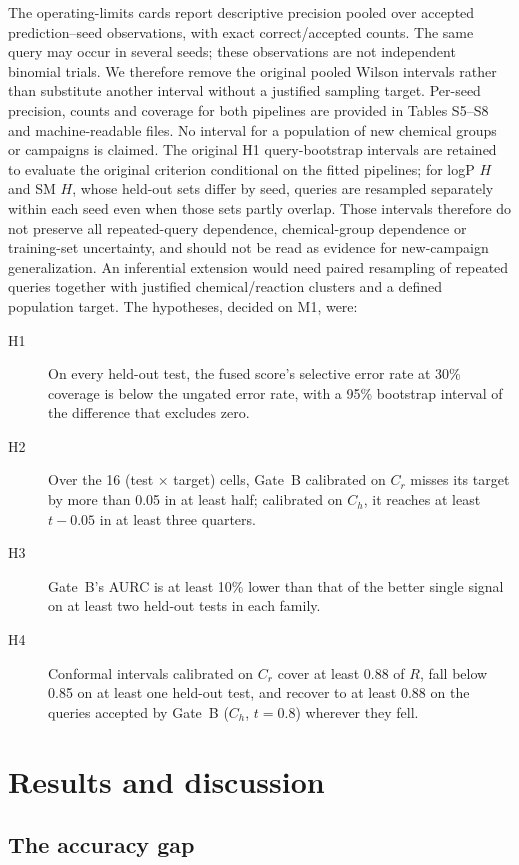 \documentclass[11pt,letterpaper]{article}
\begin{document}
The operating-limits cards report descriptive precision pooled over accepted prediction--seed observations, with exact correct/accepted counts. The same query may occur in several seeds; these observations are not independent binomial trials. We therefore remove the original pooled Wilson intervals rather than substitute another interval without a justified sampling target. Per-seed precision, counts and coverage for both pipelines are provided in Tables S5--S8 and machine-readable files. No interval for a population of new chemical groups or campaigns is claimed. The original H1 query-bootstrap intervals are retained to evaluate the original criterion conditional on the fitted pipelines; for logP $H$ and SM $H$, whose held-out sets differ by seed, queries are resampled separately within each seed even when those sets partly overlap. Those intervals therefore do not preserve all repeated-query dependence, chemical-group dependence or training-set uncertainty, and should not be read as evidence for new-campaign generalization. An inferential extension would need paired resampling of repeated queries together with justified chemical/reaction clusters and a defined population target. The hypotheses, decided on M1, were:
\begin{description}
\item[H1] On every held-out test, the fused score's selective error rate at 30\% coverage is below the ungated error rate, with a 95\% bootstrap interval of the difference that excludes zero.
\item[H2] Over the 16 (test $\times$ target) cells, Gate~B calibrated on $C_r$ misses its target by more than 0.05 in at least half; calibrated on $C_h$, it reaches at least $t-0.05$ in at least three quarters.
\item[H3] Gate~B's AURC is at least 10\% lower than that of the better single signal on at least two held-out tests in each family.
\item[H4] Conformal intervals calibrated on $C_r$ cover at least 0.88 of $R$, fall below 0.85 on at least one held-out test, and recover to at least 0.88 on the queries accepted by Gate~B ($C_h$, $t=0.8$) wherever they fell.
\end{description}

\section{Results and discussion}

\subsection{The accuracy gap}
\end{document}
